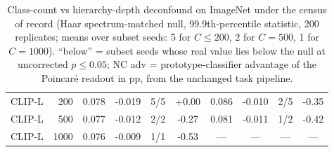 \begin{table}[H]
\begin{tabular}{lr|cccc|cccc}
CLIP-L & 200 & 0.078 & -0.019 & 5/5 & +0.00 & 0.086 & -0.010 & 2/5 & -0.35 \\
CLIP-L & 500 & 0.077 & -0.012 & 2/2 & -0.27 & 0.081 & -0.011 & 1/2 & -0.42 \\
CLIP-L & 1000 & 0.076 & -0.009 & 1/1 & -0.53 & --- & --- & --- & --- \\
\bottomrule
\end{tabular}
\caption{Class-count vs hierarchy-depth deconfound on ImageNet under the census of record (Haar spectrum-matched null, 99.9th-percentile statistic, 200 replicates; means over subset seeds: 5 for $C\le200$, 2 for $C{=}500$, 1 for $C{=}1000$). ``below'' = subset seeds whose real value lies below the null at uncorrected $p\le0.05$; NC adv = prototype-classifier advantage of the Poincar\'{e} readout in pp, from the unchanged task pipeline.}
\label{tab:b3-csweep}
\end{table}
